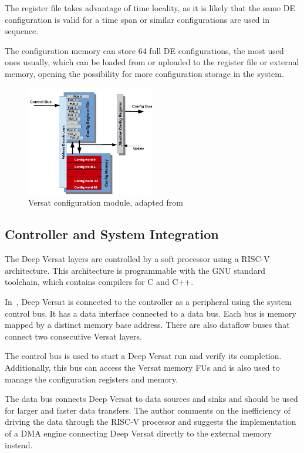 The register file takes advantage of time locality, as it is likely that the
same DE configuration is valid for a time span or similar configurations are
used in sequence.

The configuration memory can store 64 full DE configurations, the most used ones
usually, which can be loaded from or uploaded to the register file or external
memory, opening the possibility for more configuration storage in the system.
 

\begin{figure}[!htb]
	\centering
	\includegraphics[width=0.5\textwidth]{Figures/versat_config_module_edited.png}
	\caption[Caption for figure in TOC.]{Versat configuration module, adapted from~\cite{JDLopes:Thesis_Versat}}
	\label{fig:Versat_config_module}
\end{figure}


\subsection{Controller and System Integration}
\label{sec:Versat_controller}
The Deep Versat layers are controlled by a soft processor using a RISC-V
architecture. This architecture is programmable with the GNU standard toolchain,
which contains compilers for C and C++.

In~\cite{VMario:Deep_Versat}, Deep Versat is connected to the controller as a
peripheral using the system control bus. It has a data interface connected
to a data bus. Each bus is memory mapped by a distinct memory base address.
There are also dataflow buses that connect two consecutive Versat layers.

The control bus is used to start a Deep Versat run and verify its
completion. Additionally, this bus can access the Versat memory FUs and is also
used to manage the configuration registers and memory.

The data bus connects Deep Versat to data sources and sinks and should be used
for larger and faster data transfers. The author comments on the inefficiency of
driving the data through the RISC-V processor and suggests the implementation of
a DMA engine connecting Deep Versat directly to the external memory instead.
 
